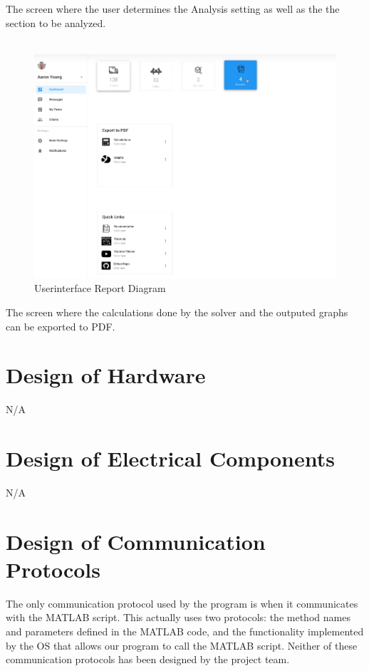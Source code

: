\documentclass[12pt, titlepage]{article}
\begin{document}
The screen where the user determines the Analysis setting as well as the the section to be analyzed.\\\\
\begin{figure}[H]
  \includegraphics[]{../images/Userinterface-Report.PNG}
  \caption{Userinterface Report Diagram}
  \label{fig:userinterface-report-diagram}
\end{figure}
The screen where the calculations done by the solver and the outputed graphs can be exported to PDF.

\section{Design of Hardware}
N/A

\section{Design of Electrical Components}
N/A

\section{Design of Communication Protocols}

The only communication protocol used by the program is when it communicates with the MATLAB script. This actually uses two protocols: the method names and parameters defined in the MATLAB code, and the functionality implemented by the OS that allows our program to call the MATLAB script. Neither of these communication protocols has been designed by the project team.
\end{document}
